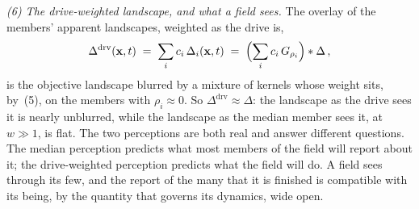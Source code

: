 \documentclass{article}
\begin{document}
\emph{(6) The drive-weighted landscape, and what a field sees.} The overlay of the members' apparent landscapes, weighted as the drive is,
\begin{equation}\label{eq:driveweighted}
  \Delta^{\mathrm{drv}}(\mathbf{x},t) \;=\; \sum_i c_i\,\Delta_i(\mathbf{x},t) \;=\; \Bigl(\sum_i c_i\, G_{\rho_i}\Bigr) \ast \Delta\,,
\end{equation}
is the objective landscape blurred by a mixture of kernels whose weight sits, by~(5), on the members with $\rho_i \approx 0$. So $\Delta^{\mathrm{drv}} \approx \Delta$: the landscape as the drive sees it is nearly unblurred, while the landscape as the median member sees it, at $w \gg 1$, is flat. The two perceptions are both real and answer different questions. The median perception predicts what most members of the field will report about it; the drive-weighted perception predicts what the field will do. A field sees through its few, and the report of the many that it is finished is compatible with its being, by the quantity that governs its dynamics, wide open.
\end{document}
